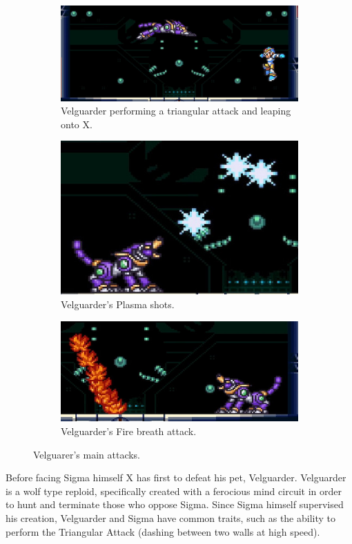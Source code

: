 \begin{figure}[htp]
	\centering
	\begin{subfigure}{0.7\linewidth}
		\centering
		\includegraphics[width=\linewidth]{figures/X1/Sigma_stages/Velguarder_leap_1.jpg}
		\caption{Velguarder performing a triangular attack and leaping onto X.}
	\end{subfigure}
	\begin{subfigure}[t]{0.40\linewidth}
		\centering
		\includegraphics[width=\linewidth]{figures/X1/Sigma_stages/Velguarder_plasma.jpg}
		\caption{Velguarder's Plasma shots.}
	\end{subfigure}
	\begin{subfigure}[t]{0.5\linewidth}
		\centering
		\includegraphics[width=\linewidth]{figures/X1/Sigma_stages/Velguarder_fire.jpg}
		\caption{Velguarder's Fire breath attack.}
	\end{subfigure}
	\caption{Velguarer's main attacks.}
\end{figure} 
Before facing Sigma himself X has first to defeat his pet, Velguarder.
Velguarder is a wolf type reploid, specifically created with a ferocious mind circuit in order to hunt and terminate those who oppose Sigma. Since Sigma himself supervised his creation, Velguarder and Sigma have common traits, such as the ability to perform the Triangular Attack (dashing between two walls at high speed).


